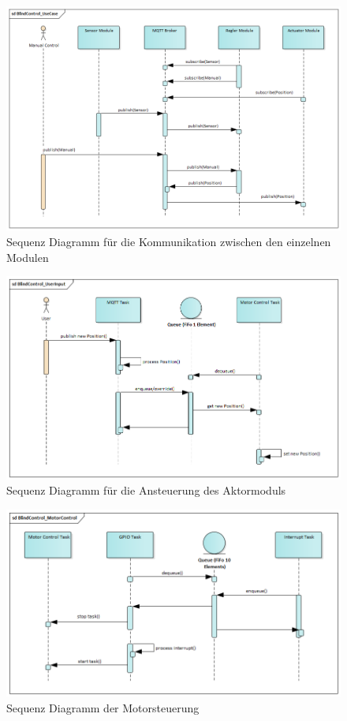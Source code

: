 \begin{figure}[hbt]
	\centering
	\includegraphics[width=1\linewidth]{images/Sequence_UseCase}
	\caption[Sequence_UseCase]{Sequenz Diagramm für die Kommunikation zwischen den einzelnen Modulen}
	\label{fig:Sequence_UseCase}
\end{figure}

\begin{figure}[hbt]
	\centering
	\includegraphics[width=1\linewidth]{images/Sequence_UserInput}
	\caption[Sequence UserInput]{Sequenz Diagramm für die Ansteuerung des Aktormoduls}
	\label{fig:Sequence_UserInput}
\end{figure}

\begin{figure}[hbt]
	\centering
	\includegraphics[width=1\linewidth]{images/Sequence_MotorControl}
	\caption[Sequence Diagramm MotorControl]{Sequenz Diagramm der Motorsteuerung}
	\label{fig:SequenceMotorControl}
\end{figure}

